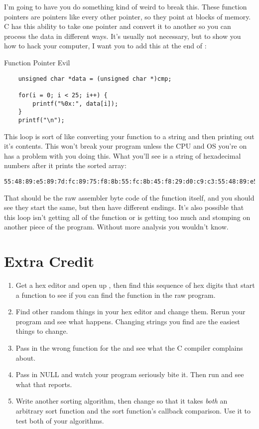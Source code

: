 I'm going to have you do something kind of weird to break this.  These function
pointers are pointers like every other pointer, so they point at blocks of
memory.  C has this ability to take one pointer and convert it to another so
you can process the data in different ways.  It's usually not necessary, but
to show you how to hack your computer, I want you to add this at the end of
:

\begin{code}{Function Pointer Evil}
\begin{lstlisting}
    unsigned char *data = (unsigned char *)cmp;

    for(i = 0; i < 25; i++) {
        printf("%0x:", data[i]);
    }
    printf("\n");
\end{lstlisting}
\end{code}

This loop is sort of like converting your function to a string and then
printing out it's contents.  This won't break your program unless the CPU and
OS you're on has a problem with you doing this.  What you'll see is a string of
hexadecimal numbers after it prints the sorted array:

\begin{Verbatim}
55:48:89:e5:89:7d:fc:89:75:f8:8b:55:fc:8b:45:f8:29:d0:c9:c3:55:48:89:e5:89:
\end{Verbatim}

That should be the raw assembler byte code of the function itself, and you
should see they start the same, but then have different endings.  It's also
possible that this loop isn't getting all of the function or is getting too
much and stomping on another piece of the program.  Without more analysis
you wouldn't know.

\section{Extra Credit}

\begin{enumerate}
\item Get a hex editor and open up , then find this sequence
    of hex digits that start a function to see if you can find the function
    in the raw program.
\item Find other random things in your hex editor and change them.  Rerun your
    program and see what happens.  Changing strings you find are the easiest
    things to change.
\item Pass in the wrong function for the  and see what
    the C compiler complains about.
\item Pass in NULL and watch your program seriously bite it.  Then run
     and see what that reports.
\item Write another sorting algorithm, then change  so
    that it takes \emph{both} an arbitrary sort function and the sort function's
    callback comparison.  Use it to test both of your algorithms.
\end{enumerate}



